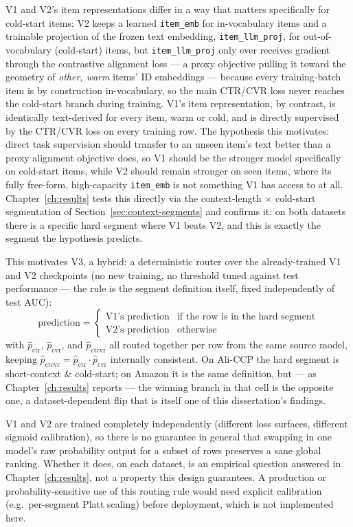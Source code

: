 V1 and V2's item representations differ in a way that matters specifically for cold-start items: V2 keeps a learned \texttt{item\_emb} for in-vocabulary items and a trainable projection of the frozen text embedding, \texttt{item\_llm\_proj}, for out-of-vocabulary (cold-start) items, but \texttt{item\_llm\_proj} only ever receives gradient through the contrastive alignment loss --- a proxy objective pulling it toward the geometry of \emph{other, warm} items' ID embeddings --- because every training-batch item is by construction in-vocabulary, so the main CTR/CVR loss never reaches the cold-start branch during training. V1's item representation, by contrast, is identically text-derived for every item, warm or cold, and is directly supervised by the CTR/CVR loss on every training row. The hypothesis this motivates: direct task supervision should transfer to an unseen item's text better than a proxy alignment objective does, so V1 should be the stronger model specifically on cold-start items, while V2 should remain stronger on seen items, where its fully free-form, high-capacity \texttt{item\_emb} is not something V1 has access to at all. Chapter~\ref{ch:results} tests this directly via the context-length $\times$ cold-start segmentation of Section~\ref{sec:context-segments} and confirms it: on both datasets there is a specific hard segment where V1 beats V2, and this is exactly the segment the hypothesis predicts.

This motivates V3, a hybrid: a deterministic router over the already-trained V1 and V2 checkpoints (no new training, no threshold tuned against test performance --- the rule is the segment definition itself, fixed independently of test AUC):
\[
\text{prediction} =
\begin{cases}
  \text{V1's prediction} & \text{if the row is in the hard segment} \\
  \text{V2's prediction} & \text{otherwise}
\end{cases}
\]
with $\hat{p}_{\text{ctr}}$, $\hat{p}_{\text{cvr}}$, and $\hat{p}_{\text{ctcvr}}$ all routed together per row from the same source model, keeping $\hat{p}_{\text{ctcvr}} = \hat{p}_{\text{ctr}} \cdot \hat{p}_{\text{cvr}}$ internally consistent. On Ali-CCP the hard segment is short-context \& cold-start; on Amazon it is the same definition, but --- as Chapter~\ref{ch:results} reports --- the winning branch in that cell is the opposite one, a dataset-dependent flip that is itself one of this dissertation's findings.

V1 and V2 are trained completely independently (different loss surfaces, different sigmoid calibration), so there is no guarantee in general that swapping in one model's raw probability output for a subset of rows preserves a sane global ranking. Whether it does, on each dataset, is an empirical question answered in Chapter~\ref{ch:results}, not a property this design guarantees. A production or probability-sensitive use of this routing rule would need explicit calibration (e.g.\ per-segment Platt scaling) before deployment, which is not implemented here.


